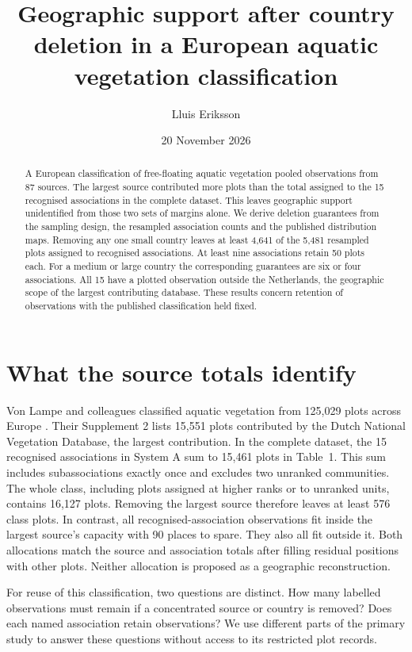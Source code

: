 \documentclass[11pt]{article}
\title{Geographic support after country deletion in a European aquatic vegetation classification}
\author{Lluis Eriksson}
\date{20 November 2026}
\begin{document}
\maketitle
\begin{abstract}
A European classification of free-floating aquatic vegetation pooled observations from 87 sources. The largest source contributed more plots than the total assigned to the 15 recognised associations in the complete dataset. This leaves geographic support unidentified from those two sets of margins alone. We derive deletion guarantees from the sampling design, the resampled association counts and the published distribution maps. Removing any one small country leaves at least 4,641 of the 5,481 resampled plots assigned to recognised associations. At least nine associations retain 50 plots each. For a medium or large country the corresponding guarantees are six or four associations. All 15 have a plotted observation outside the Netherlands, the geographic scope of the largest contributing database. These results concern retention of observations with the published classification held fixed.
\end{abstract}

\section{What the source totals identify}
Von Lampe and colleagues classified aquatic vegetation from 125,029 plots across Europe \cite{study}. Their Supplement 2 lists 15,551 plots contributed by the Dutch National Vegetation Database, the largest contribution. In the complete dataset, the 15 recognised associations in System A sum to 15,461 plots in Table~1. This sum includes subassociations exactly once and excludes two unranked communities. The whole class, including plots assigned at higher ranks or to unranked units, contains 16,127 plots. Removing the largest source therefore leaves at least 576 class plots. In contrast, all recognised-association observations fit inside the largest source's capacity with 90 places to spare. They also all fit outside it. Both allocations match the source and association totals after filling residual positions with other plots. Neither allocation is proposed as a geographic reconstruction.

For reuse of this classification, two questions are distinct. How many labelled observations must remain if a concentrated source or country is removed? Does each named association retain observations? We use different parts of the primary study to answer these questions without access to its restricted plot records.
\end{document}

